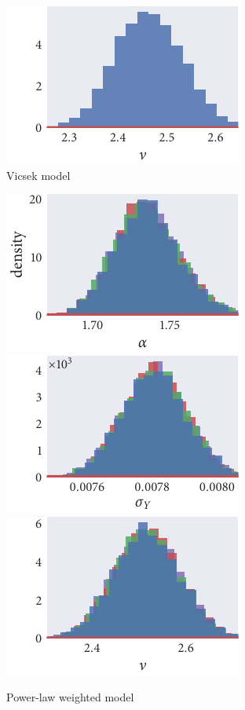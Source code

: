 \begin{figure}[p]
\begin{subfigure}[b]{\textwidth}
    \includegraphics{seq3/r_hist_nu.pdf}
    \caption{Vicsek model}
  \end{subfigure}
  \begin{subfigure}[b]{\textwidth}
    \includegraphics{seq3/power_hist_alpha.pdf}%
    \includegraphics{seq3/power_hist_sigma_Y.pdf}%
    \includegraphics{seq3/power_hist_nu.pdf}
    \caption{Power-law weighted model}
  \end{subfigure}
  \begin{subfigure}[b]{\textwidth}

\end{subfigure}
\end{figure}

